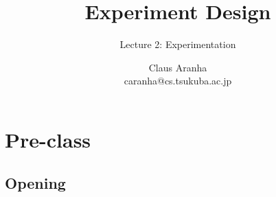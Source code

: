 \documentclass{beamer}
\title[]{Experiment Design}
\subtitle[]{Lecture 2: Experimentation}
\author[Claus Aranha]{Claus Aranha\\{\footnotesize caranha@cs.tsukuba.ac.jp}}
\institute{Department of Computer Science}
\begin{document}







% 






\section{Pre-class}
\subsection{Opening}

\begin{frame}
  \maketitle
  \begin{center}
  \end{center}
\end{frame}
\end{document}
